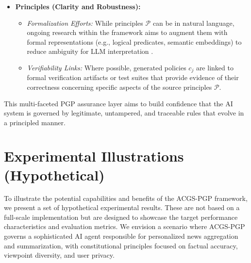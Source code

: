 \documentclass[sigconf,review,screen]{acmart}
\begin{document}
\begin{itemize}
\begin{itemize}
        \end{itemize}
    \item \textbf{Principles (Clarity and Robustness):}
        \begin{itemize}
            \item \textit{Formalization Efforts:} While principles $\mathcal{P}$ can be in natural language, ongoing research within the framework aims to augment them with formal representations (e.g., logical predicates, semantic embeddings) to reduce ambiguity for LLM interpretation \cite{huth2004logic}.
            \item \textit{Verifiability Links:} Where possible, generated policies $c_j$ are linked to formal verification artifacts or test suites that provide evidence of their correctness concerning specific aspects of the source principles $\mathcal{P}$.
        \end{itemize}
\end{itemize}
This multi-faceted PGP assurance layer aims to build confidence that the AI system is governed by legitimate, untampered, and traceable rules that evolve in a principled manner.

\section{Experimental Illustrations (Hypothetical)}
To illustrate the potential capabilities and benefits of the ACGS-PGP framework, we present a set of hypothetical experimental results. These are not based on a full-scale implementation but are designed to showcase the target performance characteristics and evaluation metrics. We envision a scenario where ACGS-PGP governs a sophisticated AI agent responsible for personalized news aggregation and summarization, with constitutional principles focused on factual accuracy, viewpoint diversity, and user privacy.
\end{document}
